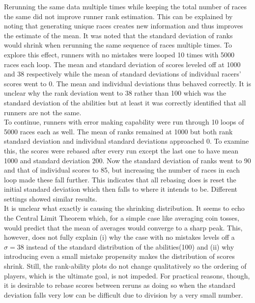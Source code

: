 Rerunning the same data multiple times while keeping the total number of races the same did not improve runner rank estimation. This can be explained by noting that generating unique races creates new information and thus improves the estimate of the mean. It was noted that the standard deviation of ranks would shrink when rerunning the same sequence of races multiple times. To explore this effect, runners with no mistakes were looped 10 times with 5000 races each loop. The mean and standard deviation of scores leveled off at 1000 and 38 respectively while the mean of standard deviations of individual racers' scores went to 0. The mean and individual deviations thus behaved correctly. It is unclear why the rank deviation went to 38 rather than 100 which was the standard deviation of the abilities but at least it was correctly identified that all runners are not the same.\\
To continue, runners with error making capability were run through 10 loops of 5000 races each as well. The mean of ranks remained at 1000 but both rank standard deviation and individual standard deviations approached 0. To examine this, the scores were rebased after every run except the last one to have mean 1000 and standard deviation 200. Now the standard deviation of ranks went to 90 and that of individual scores to 85, but increasing the number of races in each loop made these fall further. This indicates that all rebasing does is reset the initial standard deviation which then falls to where it intends to be. Different settings showed similar results.\\
It is unclear what exactly is causing the shrinking distribution. It seems to echo the Central Limit Theorem which, for a simple case like averaging coin tosses, would predict that the mean of averages would converge to a sharp peak. This, however, does not fully explain (i) why the case with no mistakes levels off a $\sigma=38$ instead of the standard distribution of the abilities(100) and (ii) why introducing even a small mistake propensity makes the distribution of scores shrink. Still, the rank-ability plots do not change qualitatively so the ordering of players, which is the ultimate goal, is not impeded. For practical reasons, though, it is desirable to rebase scores between reruns as doing so when the standard deviation falls very low can be difficult due to division by a very small number.
